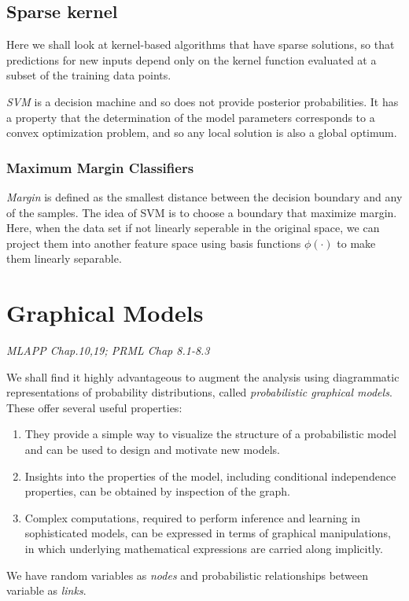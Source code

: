 \documentclass{article}
\begin{document}
\subsection{Sparse kernel}
Here we shall look at kernel-based algorithms that have sparse solutions, so that predictions for new inputs depend only on the kernel function evaluated at a subset of the training data points. 

\textit{SVM} is a decision machine and so does not provide posterior probabilities. It has a property that the  determination of the model parameters corresponds to a convex optimization problem, and so any local solution is also a global optimum.
\subsubsection*{Maximum Margin Classifiers}
\emph{Margin} is defined as the smallest distance between the decision boundary and any of  the samples. The idea of SVM is to choose a boundary that maximize margin. Here, when the data set if not linearly seperable in the original space, we can project them into another feature space using basis functions $\phi(\cdot)$ to make them linearly separable. 

\section{Graphical Models}
\emph{MLAPP Chap.10,19; PRML Chap 8.1-8.3}

We shall find it highly advantageous to augment the analysis using diagrammatic representations of probability distributions, called \textit{probabilistic graphical models}. These offer several useful properties:
\begin{enumerate}
    \item They provide a simple way to visualize the structure of a probabilistic model and can be used to design and motivate new models.
    \item Insights into the properties of the model, including conditional independence properties, can be obtained by inspection of the graph.
    \item Complex computations, required to perform inference and learning in sophisticated models, can be expressed in terms of graphical manipulations, in which underlying mathematical expressions are carried along implicitly.
\end{enumerate}
We have random variables as \emph{nodes} and probabilistic relationships between variable as \emph{links}. 
\end{document}
